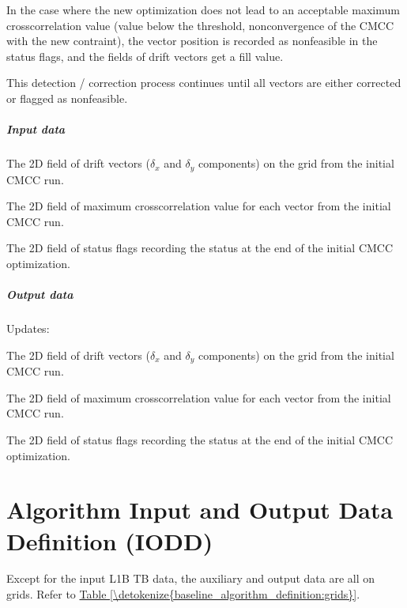 \documentclass[letterpaper,10pt,english]{jupyterBook}
\begin{document}
\sphinxAtStartPar
In the case where the new optimization does not lead to an acceptable maximum cross\sphinxhyphen{}correlation value (value below the threshold, non\sphinxhyphen{}convergence of the CMCC with the new contraint),
the vector position is recorded as non\sphinxhyphen{}feasible in the status flags, and the fields of drift vectors get a fill value.

\sphinxAtStartPar
This detection / correction process continues until all vectors are either corrected or flagged as non\sphinxhyphen{}feasible.


\paragraph{Input data}
\label{\detokenize{baseline_algorithm_definition:id19}}
\sphinxAtStartPar
The 2D field of drift vectors (\(\delta_x\) and \(\delta_y\) components) on the  grid from the initial CMCC run.

\sphinxAtStartPar
The 2D field of maximum cross\sphinxhyphen{}correlation value for each vector from the initial CMCC run.

\sphinxAtStartPar
The 2D field of status flags recording the status at the end of the initial CMCC optimization.


\paragraph{Output data}
\label{\detokenize{baseline_algorithm_definition:id20}}
\sphinxAtStartPar
Updates:

\sphinxAtStartPar
The 2D field of drift vectors (\(\delta_x\) and \(\delta_y\) components) on the  grid from the initial CMCC run.

\sphinxAtStartPar
The 2D field of maximum cross\sphinxhyphen{}correlation value for each vector from the initial CMCC run.

\sphinxAtStartPar
The 2D field of status flags recording the status at the end of the initial CMCC optimization.

\sphinxstepscope


\chapter{Algorithm Input and Output Data Definition (IODD)}
\label{\detokenize{algorithm_input_output_data_definition:algorithm-input-and-output-data-definition-iodd}}\label{\detokenize{algorithm_input_output_data_definition::doc}}
\sphinxAtStartPar
Except for the input L1B TB data, the auxiliary and output data are all on {\hyperref[\detokenize{acronyms:term-EASE2}]{}} grids. Refer to \hyperref[\detokenize{baseline_algorithm_definition:grids}]{Table \ref{\detokenize{baseline_algorithm_definition:grids}}}.
\end{document}
